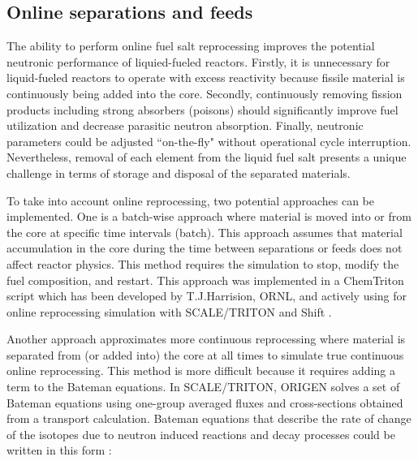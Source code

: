 \subsection{Online separations and feeds}
The ability to perform online fuel salt reprocessing improves the potential neutronic performance of liquied-fueled reactors. Firstly, it is unnecessary for liquid-fueled reactors to operate with excess reactivity because fissile material is continuously being added into the core. Secondly, continuously removing fission products including strong absorbers (poisons) should significantly improve fuel utilization and decrease parasitic neutron absorption. Finally, neutronic parameters could be adjusted ``on-the-fly" without operational cycle interruption. Nevertheless, removal of each element from the liquid fuel salt presents a unique challenge in terms of storage and disposal of the separated materials.

To take into account online reprocessing, two potential approaches can be implemented. One is a batch-wise approach where material is moved into or from the core at specific time intervals (batch). This approach assumes that material accumulation in the core during the time between separations or feeds does not affect reactor physics. This method requires the simulation to stop, modify the fuel composition, and restart. This approach was implemented in a ChemTriton script \cite{powers_new_2013} which has been developed by T.J.Harrision, \gls{ORNL}, and actively using for online reprocessing simulation with SCALE/TRITON \cite{bowman_scale_2011} and Shift \cite{pandya_implementation_2016}. 

Another approach approximates more continuous reprocessing where material is separated from (or added into) the core at all times to simulate true continuous online reprocessing. This method is more difficult because it requires adding a term to the Bateman equations. In SCALE/TRITON, ORIGEN \cite{gauld_isotopic_2011} solves a set of Bateman equations using one-group averaged fluxes and cross-sections obtained from a transport calculation. Bateman equations that describe the rate of change of the isotopes due to neutron induced reactions and decay
processes could be written in this form \cite{aufiero_extended_2013}:


